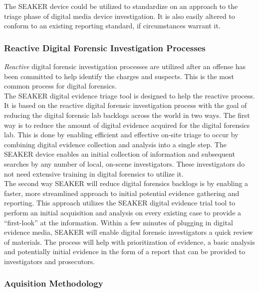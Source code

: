 \documentclass[12pt]{article}
\begin{document}
The SEAKER device could be utilized to standardize on an approach to the triage phase of 
digital media device investigation.  It is also easily altered to conform to an existing reporting
standard, if circumstances warrant it.\\

\subsubsection{Reactive Digital Forensic Investigation Processes}

\textit{Reactive} digital forensic investigation processes are utilized after an offense has been committed to help
identify the charges and suspects.  This is the most common process for digital forensics.\\

The SEAKER digital evidence triage tool is designed to help the reactive process.  
It is based on the reactive digital forensic investigation process with the goal of reducing the digital
forensic lab backlogs across the world in two ways.  The first way is to reduce the amount of digital
evidence acquired for the digital forensics lab.  This is done by enabling efficient and effective on-site triage to occur by
combining digital evidence collection and analysis into a single step.  The SEAKER device enables an initial 
collection of information and subsequent searches by any number of local,
on-scene investigators.  These investigators do not need extensive training in digital forensics to utilize it.\\

The second way SEAKER will reduce digital forensics backlogs is by enabling a faster, more streamlined approach to initial
potential evidence gathering and reporting.  This approach utilizes the SEAKER digital evidence trial tool to 
perform an initial acquisition and analysis on every existing case to provide a ``first-look'' at the information.
Within a few minutes of plugging in digital evidence media, SEAKER will enable digital 
forensic investigators a quick review of materials.  The process will help with prioritization of evidence, a basic
analysis and potentially initial evidence in the form of a report that can be provided to investigators and
prosecutors.\\

\subsubsection{Aquisition Methodology}
\end{document}
